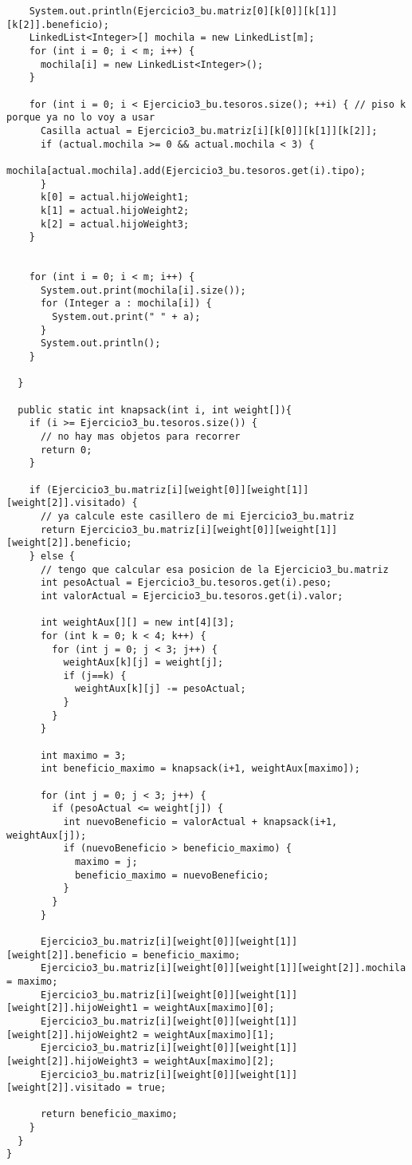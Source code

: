 \begin{lstlisting}
    System.out.println(Ejercicio3_bu.matriz[0][k[0]][k[1]][k[2]].beneficio);
    LinkedList<Integer>[] mochila = new LinkedList[m];
    for (int i = 0; i < m; i++) {
      mochila[i] = new LinkedList<Integer>();
    }

    for (int i = 0; i < Ejercicio3_bu.tesoros.size(); ++i) { // piso k porque ya no lo voy a usar
      Casilla actual = Ejercicio3_bu.matriz[i][k[0]][k[1]][k[2]];
      if (actual.mochila >= 0 && actual.mochila < 3) {
          mochila[actual.mochila].add(Ejercicio3_bu.tesoros.get(i).tipo);
      }
      k[0] = actual.hijoWeight1;
      k[1] = actual.hijoWeight2;
      k[2] = actual.hijoWeight3;
    }


    for (int i = 0; i < m; i++) {
      System.out.print(mochila[i].size());
      for (Integer a : mochila[i]) {
        System.out.print(" " + a);
      }
      System.out.println();
    }

  }

  public static int knapsack(int i, int weight[]){
    if (i >= Ejercicio3_bu.tesoros.size()) {
      // no hay mas objetos para recorrer
      return 0;
    }

    if (Ejercicio3_bu.matriz[i][weight[0]][weight[1]][weight[2]].visitado) {
      // ya calcule este casillero de mi Ejercicio3_bu.matriz
      return Ejercicio3_bu.matriz[i][weight[0]][weight[1]][weight[2]].beneficio;
    } else {
      // tengo que calcular esa posicion de la Ejercicio3_bu.matriz
      int pesoActual = Ejercicio3_bu.tesoros.get(i).peso;
      int valorActual = Ejercicio3_bu.tesoros.get(i).valor;

      int weightAux[][] = new int[4][3];
      for (int k = 0; k < 4; k++) {
        for (int j = 0; j < 3; j++) {
          weightAux[k][j] = weight[j];
          if (j==k) {
            weightAux[k][j] -= pesoActual;
          }
        }
      }

      int maximo = 3;
      int beneficio_maximo = knapsack(i+1, weightAux[maximo]);

      for (int j = 0; j < 3; j++) {
        if (pesoActual <= weight[j]) {
          int nuevoBeneficio = valorActual + knapsack(i+1, weightAux[j]);
          if (nuevoBeneficio > beneficio_maximo) {
            maximo = j;
            beneficio_maximo = nuevoBeneficio;
          }
        }
      }

      Ejercicio3_bu.matriz[i][weight[0]][weight[1]][weight[2]].beneficio = beneficio_maximo;
      Ejercicio3_bu.matriz[i][weight[0]][weight[1]][weight[2]].mochila = maximo;
      Ejercicio3_bu.matriz[i][weight[0]][weight[1]][weight[2]].hijoWeight1 = weightAux[maximo][0];
      Ejercicio3_bu.matriz[i][weight[0]][weight[1]][weight[2]].hijoWeight2 = weightAux[maximo][1];
      Ejercicio3_bu.matriz[i][weight[0]][weight[1]][weight[2]].hijoWeight3 = weightAux[maximo][2];
      Ejercicio3_bu.matriz[i][weight[0]][weight[1]][weight[2]].visitado = true;

      return beneficio_maximo;
    }
  }
}
	\end{lstlisting}
